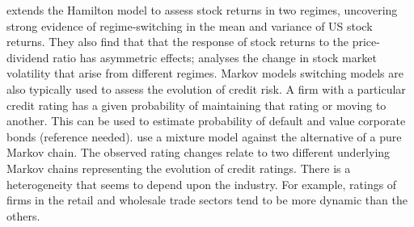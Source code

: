 \documentclass[12pt, a4paper, oneside]{article} %
\begin{document}
\citet{schaller1997regime} extends the Hamilton model to assess stock returns in two regimes, uncovering strong evidence of regime-switching in the mean and variance of US stock returns.  They also find that that the response of stock returns to the price-dividend ratio has asymmetric effects; \citet{dueker1997markov} analyses the change in stock market volatility that arise from different regimes. Markov models switching models are also typically used to assess the evolution of credit risk.  A firm with a particular credit rating has a given probability of maintaining that rating or moving to another.  This can be used to estimate probability of default and value corporate bonds (reference needed).  \citet{frydman2008credit} use a mixture model against the alternative of a pure Markov chain. The observed rating changes relate to two different underlying Markov chains representing the evolution of credit ratings.  There is a heterogeneity that seems to depend upon the industry.  For example, ratings of firms in the retail and wholesale trade sectors tend to be more dynamic than the others. 





\end{document}
